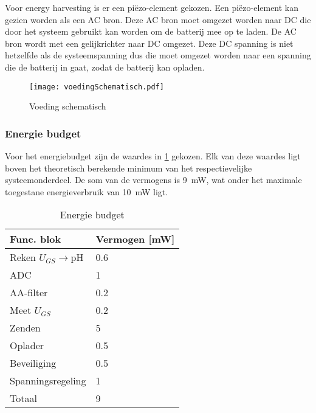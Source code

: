Voor energy harvesting is er een piëzo-element gekozen. Een piëzo-element kan gezien worden als een AC bron. Deze AC bron moet omgezet worden naar DC die door het systeem gebruikt kan worden om de batterij mee op te laden. De AC bron wordt met een gelijkrichter naar DC omgezet. Deze DC spanning is niet hetzelfde als de systeemspanning dus die moet omgezet worden naar een spanning die de batterij in gaat, zodat de batterij kan opladen.

\begin{figure}[!htb]
    \centering
    \texttt{[image: voedingSchematisch.pdf]}
    \caption{Voeding schematisch}
    \label{fig:voedingSchematisch}
\end{figure}



\subsubsection{Energie budget}\label{sec:energyBudgets}
Voor het energiebudget zijn de waardes in \cref{tab:energieBudgetEstimatie} gekozen. Elk van deze waardes ligt boven het theoretisch berekende minimum van het respectievelijke systeemonderdeel. De som van de vermogens is \qty{9}{\milli\watt}, wat onder het maximale toegestane energieverbruik van \qty{10}{\milli\watt} ligt.


\begin{table}[!htb]
    \centering
    \begin{tabular}{l|l}
        Func. blok          & Vermogen [mW] \\
        \hline
        Reken $U_{GS}\rightarrow$pH & 0.6   \\
        ADC                 & 1             \\
        AA-filter           & 0.2           \\
        Meet $U_{GS}$       & 0.2           \\
        Zenden              & 5             \\
        Oplader             & 0.5           \\
        Beveiliging         & 0.5           \\
        Spanningsregeling   & 1             \\
        \hline
        \hline
        Totaal              & 9

    \end{tabular}
    \caption{Energie budget}
    \label{tab:energieBudgetEstimatie}
\end{table}


